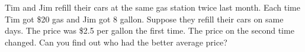 \begin{exercise}
	Tim and Jim refill their cars at the same gas station twice last month. Each time Tim got \$20 gas and Jim got 8 gallon. Suppose they refill their cars on same days. The price was \$2.5 per gallon the first time. The price on the second time changed. Can you find out who had the better average price?
\end{exercise}

\vfill
\begin{center} \hfill
\end{center}